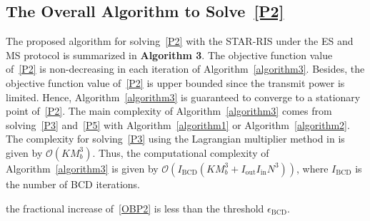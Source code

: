 \documentclass[12pt, draftclsnofoot, onecolumn]{IEEEtran}
\begin{document}
\subsection{The Overall Algorithm to Solve~\eqref{P2}}
The proposed algorithm for solving~\eqref{P2} with the STAR-RIS under the ES and MS protocol is summarized in \textbf{Algorithm 3}. The objective function value of~\eqref{P2} is non-decreasing in each iteration of Algorithm~\ref{algorithm3}. Besides, the objective function value of~\eqref{P2} is upper bounded since the transmit power is limited. Hence, Algorithm~\ref{algorithm3} is guaranteed to converge to a stationary point of~\eqref{P2}. The main complexity of Algorithm~\ref{algorithm3} comes from solving~\eqref{P3} and~\eqref{P5} with Algorithm~\ref{algorithm1} or Algorithm~\ref{algorithm2}. The complexity for solving~\eqref{P3} using the Lagrangian multiplier method in \cite{pan2020multicell} is given by $\mathcal{O}\left(K M_b^3\right)$. Thus, the computational complexity of Algorithm~\ref{algorithm3} is given by $\mathcal{O}\left({I}_\text{BCD}\left(K M_b^3 + {I}_\text{out} {I}_\text{in}  N^3\right)\right)$, where ${I}_\text{BCD}$ is the number of BCD iterations.
\begin{algorithm}[htbp]
\caption{Proposed BCD-PEN Algorithm}\label{algorithm3}
\begin{algorithmic}[1]
 the fractional increase of~\eqref{OBP2} is less than the threshold $\epsilon_{\text{BCD}}$.
\end{algorithmic}
\end{algorithm} 
\end{document}
